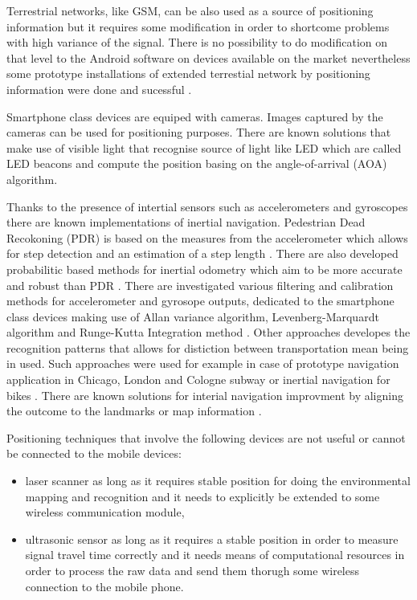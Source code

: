 \documentclass[../main.tex]{subfiles}
\begin{document}
Terrestrial networks, like GSM, can be also used as a source of positioning information but it requires some modification in order to shortcome problems with high variance of the signal. There is no possibility to do modification on that level to the Android software on devices available on the market nevertheless some prototype installations of extended terrestial network by positioning information were done and sucessful \cite{terrestrial_positioning}\cite{terrestrial_positioning_tdoa}.

Smartphone class devices are equiped with cameras. Images captured by the cameras can be used for positioning purposes. There are known solutions that make use of visible light \cite{visible_light_positioning} that recognise source of light like LED which are called LED beacons and compute the position basing on the angle-of-arrival (AOA) algorithm.

Thanks to the presence of intertial sensors such as accelerometers and gyroscopes there are known implementations of inertial navigation. Pedestrian Dead Recokoning (PDR) is based on the measures from the accelerometer which allows for step detection and an estimation of a step length \cite{inertial_navi_unaided} \cite{inertial_navi_pocket} \cite{inertial_navi_velocity_model}. There are also developed probabilitic based methods for inertial odometry which aim to be more accurate and robust than PDR \cite{article_inertial_navi_handheld_prob}. There are investigated various filtering and calibration methods for accelerometer and gyrosope outputs, dedicated to the smartphone class devices making use of Allan variance algorithm, Levenberg-Marquardt algorithm and Runge-Kutta Integration method \cite{article_intertial_test_smartphone_calibration}\cite{article_intertial_calibration}.  Other approaches developes the recognition patterns that allows for distiction between transportation mean being in used. Such approaches were used for example in case of prototype navigation application in Chicago, London and Cologne subway \cite{inertial_navi_subway} or inertial navigation for bikes \cite{inertial_navi_bike}. There are known solutions for interial navigation improvment by aligning the outcome to the landmarks or map information \cite{positioning_tests}.

Positioning techniques that involve the following devices are not useful or cannot be connected to the mobile devices:
\begin{itemize}
	\item laser scanner as long as it requires stable position for doing the environmental mapping and recognition and it needs to explicitly be extended to some wireless communication module,
	\item ultrasonic sensor as long as it requires a stable position in order to measure signal travel time correctly and it needs means of computational resources in order to process the raw data and send them thorugh some wireless connection to the mobile phone.
\end{itemize}
\end{document}
